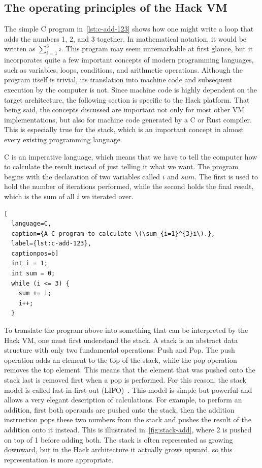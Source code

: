 \subsection{The operating principles of the Hack VM}
The simple C program in~\cref{lst:c-add-123} shows how one might write a loop that adds the numbers 1, 2, and 3 together.
In mathematical notation, it would be written as \(\sum_{i=1}^{3}i\).
This program may seem unremarkable at first glance, but it incorporates quite a few important concepts of modern programming languages, such as variables, loops, conditions, and arithmetic operations.
Although the program itself is trivial, its translation into machine code and subsequent execution by the computer is not.
Since machine code is highly dependent on the target architecture, the following section is specific to the Hack platform. That being said, the concepts discussed are important not only for most other VM implementations, but also for machine code generated by a C or Rust compiler.
This is especially true for the stack, which is an important concept in almost every existing programming language.

C is an imperative language, which means that we have to tell the computer how to calculate the result instead of just telling it what we want.
The program begins with the declaration of two variables called \(i\) and \(sum\).
The first is used to hold the number of iterations performed, while the second holds the final result, which is the sum of all \(i\) we iterated over.

\begin{lstlisting}[
  language=C,
  caption={A C program to calculate \(\sum_{i=1}^{3}i\).},
  label={lst:c-add-123},
  captionpos=b]
  int i = 1;
  int sum = 0;
  while (i <= 3) {
    sum += i;
    i++;
  }
\end{lstlisting}

To translate the program above into something that can be interpreted by the Hack VM, one must first understand the stack.
A stack is an abstract data structure with only two fundamental operations: Push and Pop.
The push operation adds an element to the top of the stack, while the pop operation removes the top element.
This means that the element that was pushed onto the stack last is removed first when a pop is performed.
For this reason, the stack model is called last-in-first-out (LIFO)~\cite{nisan2005}.
This model is simple but powerful and allows a very elegant description of calculations.
For example, to perform an addition, first both operands are pushed onto the stack, then the addition instruction pops these two numbers from the stack and pushes the result of the addition onto it instead.
This is illustrated in~\cref{fig:stack-add}, where 2 is pushed on top of 1 before adding both.
The stack is often represented as growing downward, but in the Hack architecture it actually grows upward, so this representation is more appropriate.

